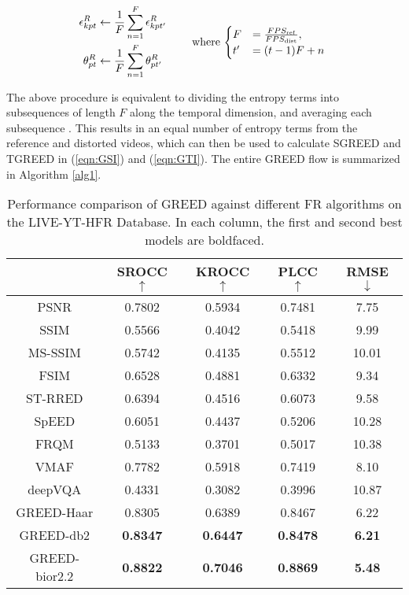 \documentclass[journal]{IEEEtran}
\begin{document}
\begin{equation*}
\begin{aligned}
{\epsilon}_{kpt}^R &\leftarrow \frac{1}{F}\sum_{n=1}^F \epsilon_{kpt'}^R
 &\quad &\raisebox{-1.5\normalbaselineskip}[0pt][0pt]{
     where \text{$
     \begin{cases}
        F &= \frac{FPS_{\textrm{ref}}}{FPS_{\textrm{dist}}}, \\
        t' &= (t - 1)F + n
      \end{cases}$
    }} \\
{\theta}_{pt}^R &\leftarrow \frac{1}{F}\sum_{n=1}^F \theta_{pt'}^R
\end{aligned}
\end{equation*}

The above procedure is equivalent to dividing the entropy terms into subsequences of length $F$ along the temporal dimension, and averaging each subsequence \cite{mackin2018study}. This results in an equal number of entropy terms from the reference and distorted videos, which can then be used to calculate SGREED and TGREED in (\ref{eqn:GSI}) and (\ref{eqn:GTI}). The entire GREED flow is summarized in Algorithm \ref{alg1}.

\begin{table}[t]
\caption{Performance comparison of GREED against different FR algorithms on the LIVE-YT-HFR Database. In each column, the first and second best models are boldfaced.}
    \label{Table:MOS_comparison}
    \centering
    \begin{tabular}{|c||c|c|c|c|}
        \hline
        ~    & SROCC $\uparrow$ & KROCC $\uparrow$ & PLCC $\uparrow$ & RMSE $\downarrow$ \\ \hline \hline
        PSNR & 0.7802 & 0.5934 & 0.7481 & 7.75 \\ 
        SSIM \cite{wang2004image} & 0.5566 & 0.4042 & 0.5418 & 9.99 \\ 
        MS-SSIM \cite{wang2003multiscale} & 0.5742 & 0.4135 & 0.5512 & 10.01 \\ 
        FSIM \cite{zhang2011fsim} & 0.6528 & 0.4881 & 0.6332 & 9.34 \\ 
        ST-RRED \cite{soundararajan2012video} & 0.6394 & 0.4516 & 0.6073 & 9.58 \\ 
        SpEED \cite{bampis2017speed} & 0.6051 & 0.4437 & 0.5206 & 10.28 \\ 
        FRQM \cite{zhang2017frame} & 0.5133 & 0.3701 & 0.5017 & 10.38 \\ 
        VMAF \cite{VMAF2016}& 0.7782 & 0.5918 & 0.7419 & 8.10 \\
        deepVQA \cite{kim2018deep} & 0.4331 & 0.3082 & 0.3996 & 10.87 \\ \hline
        GREED-Haar & 0.8305 & 0.6389 & 0.8467 & 6.22 \\
        GREED-db2 & \textbf{0.8347} & \textbf{0.6447} & \textbf{0.8478} & \textbf{6.21} \\
        GREED-bior2.2 & \textbf{0.8822} & \textbf{0.7046} & \textbf{0.8869} & \textbf{5.48} \\
        \hline
    \end{tabular}
\end{table}
\end{document}
